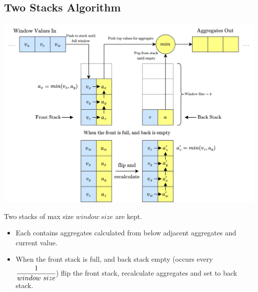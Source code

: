 \subsection{Two Stacks Algorithm}
\begin{center}
    \includegraphics[width=.9\textwidth]{streams/images/two_stacks.drawio.png}
\end{center}
Two stacks of max size $window \ size$ are kept.
\begin{itemize}
    \item Each contains aggregates calculated from below adjacent aggregates and current value.
    \item When the front stack is full, and back stack empty (occurs every $\cfrac{1}{window \ size}$) flip the front stack, recalculate aggregates and set to back stack.
\end{itemize}

